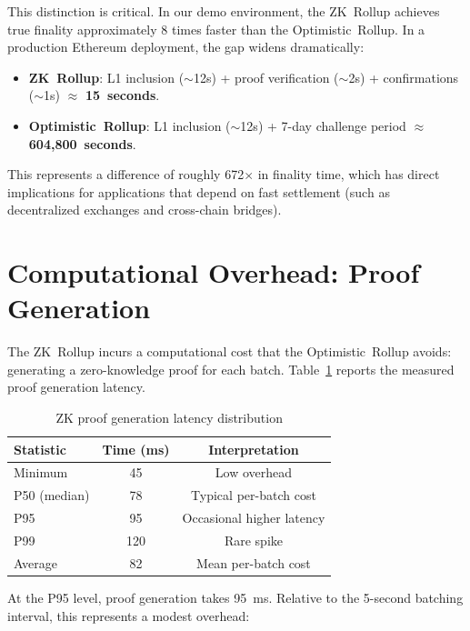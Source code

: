 This distinction is critical. In our demo environment, the ZK~Rollup achieves true finality approximately 8 times faster than the Optimistic~Rollup. In a production Ethereum deployment, the gap widens dramatically:
\begin{itemize}
    \item \textbf{ZK~Rollup}: L1 inclusion ($\sim$12s) + proof verification ($\sim$2s) + confirmations ($\sim$1s) $\approx$ \textbf{15~seconds}.
    \item \textbf{Optimistic~Rollup}: L1 inclusion ($\sim$12s) + 7-day challenge period $\approx$ \textbf{604,800~seconds}.
\end{itemize}

This represents a difference of roughly 672$\times$ in finality time, which has direct implications for applications that depend on fast settlement (such as decentralized exchanges and cross-chain bridges).

\section{Computational Overhead: Proof Generation}

The ZK~Rollup incurs a computational cost that the Optimistic~Rollup avoids: generating a zero-knowledge proof for each batch. Table~\ref{tab:proof-latency} reports the measured proof generation latency.

\begin{table}[h]
    \centering
    \begin{tabular}{l|c|c}
        \hline
        \textbf{Statistic} & \textbf{Time (ms)} & \textbf{Interpretation} \\
        \hline
        Minimum & 45 & Low overhead \\
        \hline
        P50 (median) & 78 & Typical per-batch cost \\
        \hline
        P95 & 95 & Occasional higher latency \\
        \hline
        P99 & 120 & Rare spike \\
        \hline
        Average & 82 & Mean per-batch cost \\
        \hline
    \end{tabular}
    \caption{ZK proof generation latency distribution}
    \label{tab:proof-latency}
\end{table}

At the P95 level, proof generation takes 95~ms. Relative to the 5-second batching interval, this represents a modest overhead:

